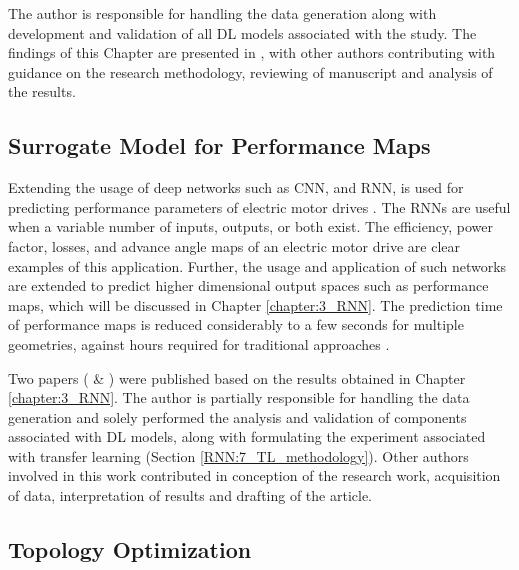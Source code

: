 The author is responsible for handling the data generation along with development and validation of all DL models associated with the study. The findings of this Chapter are presented in \cite{khan2019deep}, with other authors contributing with guidance on the research methodology, reviewing of manuscript and analysis of the results.

\subsection{Surrogate Model for Performance Maps}

Extending the usage of deep networks such as CNN, and RNN, is used for predicting performance parameters of electric motor drives \parencite{khan2020efficiency}. The RNNs are useful when a variable number of inputs, outputs, or both exist. The efficiency, power factor, losses, and advance angle maps of an electric motor drive are clear examples of this application.
Further, the usage and application of such networks are extended to predict higher dimensional output spaces such as performance maps, which will be discussed in Chapter \ref{chapter:3_RNN}. The prediction time of performance maps is reduced considerably to a few seconds for multiple geometries, against hours required for traditional approaches \parencite{mohammadi2017computational}.

Two papers (\cite{khan2020efficiency} \& \cite{khan_transfer}) were published based on the results obtained in Chapter \ref{chapter:3_RNN}. The author is partially responsible for handling the data generation and solely performed the analysis and validation of components associated with DL models, along with formulating the experiment associated with transfer learning (Section \ref{RNN:7_TL_methodology}). Other authors involved in this work contributed in conception of the research work, acquisition of data, interpretation of results and drafting of the article.

\subsection{Topology Optimization}

